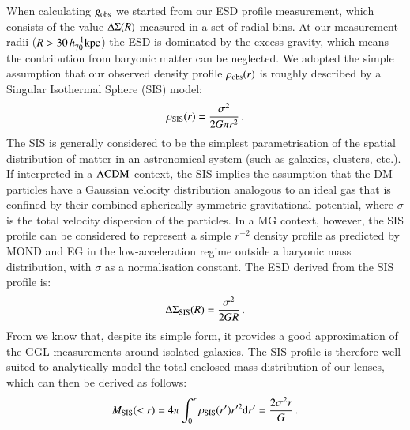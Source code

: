 \documentclass{aa}
\newcommand{\hkpc}{\,h_{70}^{-1}{\rm{kpc}} }
\renewcommand{\Upsigma}{{\rm \Sigma}}
\renewcommand{\Updelta}{{\rm \Delta}}
\newcommand{\lcdm}{{\rm \Lambda CDM}}
\newcommand{\un}[1]{_{\rm #1}}
\begin{document}
When calculating $g\un{obs}$ we started from our ESD profile measurement, which consists of the value $\Updelta\Upsigma(R)$ measured in a set of radial bins. At our measurement radii ($R>30\hkpc$) the ESD is dominated by the excess gravity, which means the contribution from baryonic matter can be neglected. We adopted the simple assumption that our observed density profile $\rho\un{obs}(r)$ is roughly described by a Singular Isothermal Sphere (SIS) model:
\begin{equation}\label{eq:rho_SIS}
\rho\un{SIS}(r) = \frac{\sigma^2}{2 G \pi r^2} \, . 
\end{equation}
The SIS is generally considered to be the simplest parametrisation of the spatial distribution of matter in an astronomical system (such as galaxies, clusters, etc.). If interpreted in a $\lcdm$ context, the SIS implies the assumption that the DM particles have a Gaussian velocity distribution analogous to an ideal gas that is confined by their combined spherically symmetric gravitational potential, where $\sigma$ is the total velocity dispersion of the particles. In a MG context, however, the SIS profile can be considered to represent a simple $r^{-2}$ density profile as predicted by MOND and EG in the low-acceleration regime outside a baryonic mass distribution, with $\sigma$ as a normalisation constant. The ESD derived from the SIS profile is:
\begin{equation}\label{eq:ESD_SIS}
\Updelta\Upsigma\un{SIS}(R) = \frac{\sigma^2}{2 G R} \, .
\end{equation}
From \cite{brouwer2017} we know that, despite its simple form, it provides a good approximation of the GGL measurements around isolated galaxies. The SIS profile is therefore well-suited to analytically model the total enclosed mass distribution of our lenses, which can then be derived as follows:
\begin{equation}\label{eq:mass_SIS}
M\un{SIS}(<r) = 4 \pi \int_{0}^{r}\rho\un{SIS}(r') r'^2 {\rm d} r' = \frac{2\sigma^2 r}{G} \, .
\end{equation}
\end{document}
